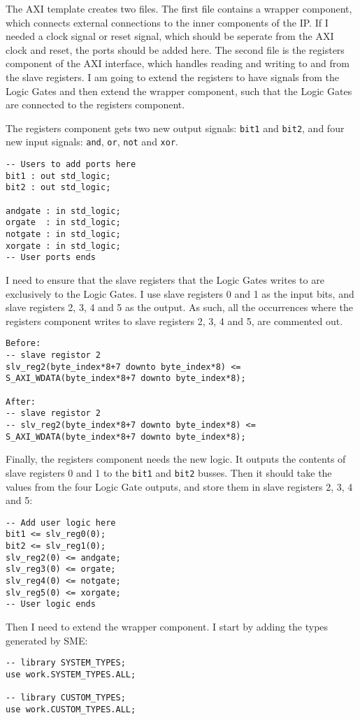 The AXI template creates two files. The first file contains a wrapper
component, which connects external connections to the inner components of the
IP. If I needed a clock signal or reset signal, which should be seperate from
the AXI clock and reset, the ports should be added here. The second file is the
registers component of the AXI interface, which handles reading and writing to
and from the slave registers.  I am going to extend the registers to have
signals from the Logic Gates and then extend the wrapper component, such that
the Logic Gates are connected to the registers component.

The registers component gets two new output signals: \texttt{bit1} and
\texttt{bit2}, and four new input signals: \texttt{and}, \texttt{or},
\texttt{not} and \texttt{xor}.
\begin{lstlisting}
-- Users to add ports here
bit1 : out std_logic;
bit2 : out std_logic;

andgate : in std_logic;
orgate  : in std_logic;
notgate : in std_logic;
xorgate : in std_logic;
-- User ports ends
\end{lstlisting}
I need to ensure that the slave registers that the Logic Gates writes to
are exclusively to the Logic Gates. I use slave registers 0 and 1 as the
input bits, and slave registers 2, 3, 4 and 5 as the output. As such, all the
occurrences where the registers component writes to slave registers 2, 3, 4 and 5,
are commented out.
\begin{lstlisting}
Before:
-- slave registor 2
slv_reg2(byte_index*8+7 downto byte_index*8) <= S_AXI_WDATA(byte_index*8+7 downto byte_index*8);

After:
-- slave registor 2
-- slv_reg2(byte_index*8+7 downto byte_index*8) <= S_AXI_WDATA(byte_index*8+7 downto byte_index*8);
\end{lstlisting}
Finally, the registers component needs the new logic. It outputs the contents of slave registers 0 and 1 to the \texttt{bit1} and
\texttt{bit2} busses. Then it should take the values from the four Logic Gate
outputs, and store them in slave registers 2, 3, 4 and 5:
\begin{lstlisting}
-- Add user logic here
bit1 <= slv_reg0(0);
bit2 <= slv_reg1(0);
slv_reg2(0) <= andgate;
slv_reg3(0) <= orgate;
slv_reg4(0) <= notgate;
slv_reg5(0) <= xorgate;
-- User logic ends
\end{lstlisting}
Then I need to extend the wrapper component. I start by adding the types
generated by SME:
\begin{lstlisting}
-- library SYSTEM_TYPES;
use work.SYSTEM_TYPES.ALL;

-- library CUSTOM_TYPES;
use work.CUSTOM_TYPES.ALL;
\end{lstlisting}
